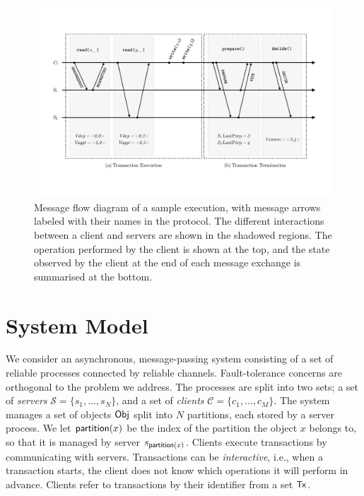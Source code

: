 \begin{figure}[t]
\vspace{-2cm}
\includegraphics[width=\textwidth]{figures/ch4_execution.pdf}
\vspace{-2cm}
\caption{Message flow diagram of a sample execution, with message arrows labeled with their names in the protocol. The different interactions between a client and servers are shown in the shadowed regions. The operation performed by the client is shown at the top, and the state observed by the client at the end of each message exchange is summarised at the bottom.}
\label{fig:execution}
\end{figure}

\section{System Model}


We consider an asynchronous, message-passing system consisting of a set of reliable processes connected by reliable channels. Fault-tolerance concerns are orthogonal to the problem we address. The processes are split into two sets; a set of \emph{servers} $\mathcal{S} = \{s_1, \dots, s_N\}$, and a set of \emph{clients} $\mathcal{C} = \{c_1, \dots, c_M\}$. The system manages a set of objects ${\sf Obj}$ split into $N$ partitions, each stored by a server process. We let $\mathsf{partition}(x)$ be the index of the partition the object $x$ belongs to, so that it is managed by server $s_{\mathsf{partition}(x)}$. Clients execute transactions by communicating with servers. Transactions can be \emph{interactive}, i.e., when a transaction starts, the client does not know which operations it will perform in advance. Clients refer to transactions by their identifier from a set ${\sf Tx}$.

